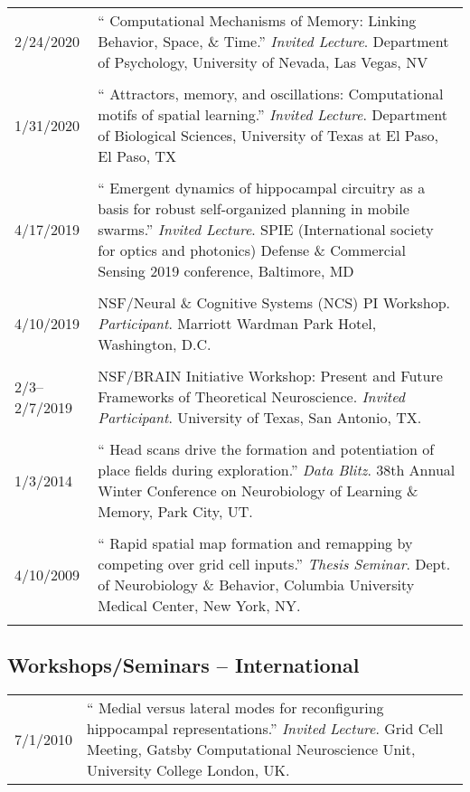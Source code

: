 \documentclass[10pt]{article}
\newcommand{\unpubtitle}[1]{{\color{hopkinsblue} #1}}
\begin{document}
\begin{longtable}{@{\hspace{0.2in}}l>{\raggedright\arraybackslash}p{}}
  2/24/2020 \hspace{0.3in} & ``\unpubtitle{Computational Mechanisms of Memory:
  Linking Behavior, Space, \& Time}.'' \emph{Invited Lecture}. Department of
  Psychology, University of Nevada, Las Vegas, NV\\
  \tabularnewline
  1/31/2020 \hspace{0.3in} & ``\unpubtitle{Attractors, memory, and oscillations:
  Computational motifs of spatial learning}.'' \emph{Invited Lecture}.
  Department of Biological Sciences, University of Texas at El Paso, El Paso, TX\\
  \tabularnewline
  4/17/2019 \hspace{0.3in} & ``\unpubtitle{Emergent dynamics of hippocampal
  circuitry as a basis for robust self-organized planning in mobile swarms}.''
  \emph{Invited Lecture}. SPIE (International society for optics and photonics)
  Defense \& Commercial Sensing 2019 conference, Baltimore, MD\\
  \tabularnewline
  4/10/2019 & NSF/Neural \& Cognitive Systems (NCS) PI
  Workshop. \emph{Participant}. Marriott Wardman Park Hotel, Washington, D.C.\\
  \tabularnewline
  2/3--2/7/2019 & NSF/BRAIN Initiative Workshop: Present and Future Frameworks
  of Theoretical Neuroscience. \emph{Invited Participant}. University of Texas,
  San Antonio, TX.\\
  \tabularnewline
  1/3/2014 & ``\unpubtitle{Head scans drive the formation and potentiation
  of place fields during exploration}.'' \emph{Data Blitz}. 38th Annual Winter
  Conference on Neurobiology of Learning \& Memory, Park City, UT.\\
  \tabularnewline
  4/10/2009 & ``\unpubtitle{Rapid spatial map formation and remapping by
  competing over grid cell inputs}.'' \emph{Thesis Seminar}. Dept. of Neurobiology
  \& Behavior, Columbia University Medical Center, New York, NY.\\
  \tabularnewline
\end{longtable}

\subsection*{Workshops/Seminars -- International}

\begin{tabular}{@{\hspace{0.2in}}l>{\raggedright\arraybackslash}p{}}
  7/1/2010 \hspace{0.2in} & ``\unpubtitle{Medial versus lateral modes for
  reconfiguring hippocampal representations}.'' \emph{Invited Lecture}. Grid
  Cell Meeting, Gatsby Computational Neuroscience Unit, University College
  London, UK.\\
\end{tabular}
\end{document}
